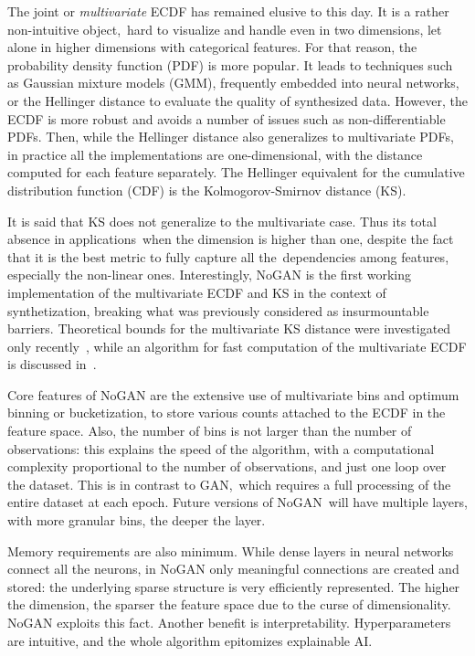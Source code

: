 \documentclass[oneside,10pt]{book}
\begin{document}
The joint or {\em multivariate} ECDF has remained elusive to this day. It is a rather non-intuitive object,~hard to visualize and handle even in two dimensions, let alone in higher dimensions with categorical features. For that reason, the probability density function (PDF) is more popular. It leads to techniques such as
 \textcolor{index}{Gaussian mixture models} (GMM), frequently embedded into neural networks,
  or the \textcolor{index}{Hellinger distance} to evaluate the quality of synthesized data. However, the ECDF is more robust and avoids a number of issues such as non-differentiable PDFs. Then, while the Hellinger distance also generalizes to multivariate PDFs, in practice all the implementations are one-dimensional, with the distance computed for each feature separately.  The Hellinger equivalent for the cumulative distribution function (CDF) is the
\textcolor{index}{Kolmogorov-Smirnov distance} (KS).

It is said that KS does not generalize to the multivariate case. Thus its
 total absence in applications~when the dimension is higher than one, despite the fact that it is the best metric to fully capture all
the~dependencies among features, especially the non-linear ones. Interestingly, NoGAN is the first
 working implementation of the multivariate ECDF and KS in the context of synthetization, breaking what was previously considered as insurmountable barriers.
 Theoretical bounds for the multivariate KS distance were investigated only recently~\cite{gtepouc21}, while an algorithm
 for fast computation of the multivariate ECDF is discussed in~\cite{putrider22}.


Core features of NoGAN are the extensive use of multivariate bins and
\textcolor{index}{optimum binning} or bucketization, to store various counts
 attached to the ECDF in the feature space. Also, the number of bins is not larger than the number of observations: this explains
  the speed of the algorithm, with a computational complexity proportional to the number of observations, and just one loop over the dataset.
 This is in contrast to GAN,~which requires a full processing of the entire dataset at each \textcolor{index}{epoch}. Future versions of NoGAN~will have multiple layers,
 with more granular bins, the deeper the layer.

Memory requirements are also minimum. While dense layers in
 neural networks connect all the neurons, in NoGAN only meaningful connections are created and stored: the underlying sparse structure is very efficiently
 represented. The higher the dimension, the sparser the feature space due to the curse of dimensionality. NoGAN exploits this fact. Another benefit is interpretability. Hyperparameters are intuitive, and the whole algorithm epitomizes \textcolor{index}{explainable AI}.
\end{document}
